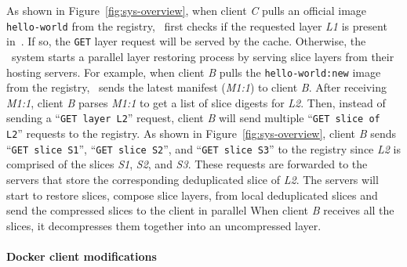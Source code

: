 As shown in Figure~\ref{fig:sys-overview},
when client \textit{C} pulls an official image \texttt{hello-world} from the registry,
\sysname~first checks if the requested layer \textit{L1} is present in~\preconstructcachename.
If so, the \texttt{GET} layer request will be served by the cache.
Otherwise, the \dedupname~system starts a parallel layer restoring process by serving slice layers from their hosting servers.
For example, when client \textit{B} pulls the \texttt{hello-world:new} image from the registry,
\sysname~sends the latest manifest (\textit{M1:1}) to client \textit{B}.
After receiving \textit{M1:1}, client \textit{B} 
parses \textit{M1:1} to get a list of slice digests for \textit{L2}.
Then, instead of sending a ``\texttt{GET layer L2}'' request, client \textit{B} will send multiple ``\texttt{GET slice of L2}'' requests to the registry.
As shown in Figure~\ref{fig:sys-overview}, client \textit{B} sends ``\texttt{GET slice S1}'', ``\texttt{GET slice S2}'', and 
``\texttt{GET slice S3}'' to the registry 
since \textit{L2} is comprised of the slices \textit{S1}, \textit{S2}, and \textit{S3}.
These requests are forwarded to the servers that store the corresponding deduplicated slice of \textit{L2}.
The servers will start to restore slices, \ie compose slice layers, from local deduplicated slices and send the compressed slices to the client 
in parallel %
When client \textit{B} receives all the slices, it decompresses them together into an uncompressed layer.

\paragraph{Docker client modifications}
 
